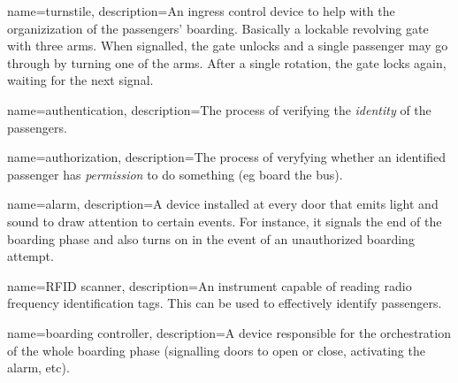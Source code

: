 {%
	name=turnstile,
	description={An ingress control device to help with the organizization
	of the passengers’ boarding. Basically a lockable revolving gate with
	three arms. When signalled, the gate unlocks and a single passenger may
	go through by turning one of the arms. After a single rotation, the gate
	locks again, waiting for the next signal.}
}

{%
	name=authentication,
	description={The process of verifying the \textit{identity} of the
	passengers.}
}

{%
	name=authorization,
	description={The process of veryfying whether an identified passenger
	has \textit{permission} to do something (eg board the bus).}
}

{%
	name=alarm,
	description={A device installed at every door that emits light and sound
	to draw attention to certain events. For instance, it signals the end of
	the boarding phase and also turns on in the event of an unauthorized
	boarding attempt.}
}

{%
	name={RFID scanner},
	description={An instrument capable of reading radio frequency
	identification tags. This can be used to effectively identify
	passengers.}
}

{%
	name={boarding controller},
	description={A device responsible for the orchestration of the whole
	boarding phase (signalling doors to open or close, activating the alarm,
	etc).}
}
